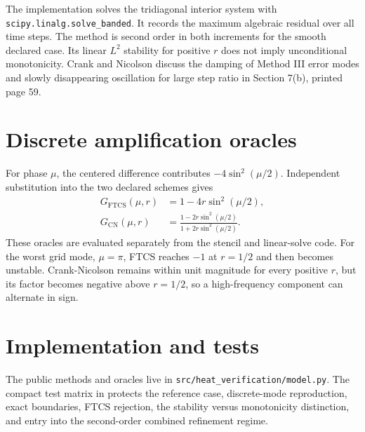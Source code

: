 \documentclass[11pt]{article}
\begin{document}
The implementation solves the tridiagonal interior system with
\texttt{scipy.linalg.solve\_banded}. It records the maximum algebraic residual
over all time steps. The method is second order in both increments for the
smooth declared case. Its linear \(L^2\) stability for positive \(r\) does not
imply unconditional monotonicity. Crank and Nicolson discuss the damping of
Method III error modes and slowly disappearing oscillation for large step
ratio in Section 7(b), printed page 59.

\section{Discrete amplification oracles}

For phase \(\mu\), the centered difference contributes
\(-4\sin^2(\mu/2)\). Independent substitution into the two declared schemes
gives
\begin{align}
  G_{\mathrm{FTCS}}(\mu,r)
  &=1-4r\sin^2(\mu/2),
  \label{eq:ftcs-amplification}\\
  G_{\mathrm{CN}}(\mu,r)
  &=\frac{1-2r\sin^2(\mu/2)}
          {1+2r\sin^2(\mu/2)}.
  \label{eq:cn-amplification}
\end{align}
These oracles are evaluated separately from the stencil and linear-solve code.
For the worst grid mode, \(\mu=\pi\), FTCS reaches \(-1\) at \(r=1/2\) and
then becomes unstable. Crank-Nicolson remains within unit magnitude for every
positive \(r\), but its factor becomes negative above \(r=1/2\), so a
high-frequency component can alternate in sign.

\section{Implementation and tests}

The public methods and oracles live in
\texttt{src/heat\_verification/model.py}. The compact test matrix in
 protects the reference case,
discrete-mode reproduction, exact boundaries, FTCS rejection, the stability
versus monotonicity distinction, and entry into the second-order combined
refinement regime.
\end{document}
